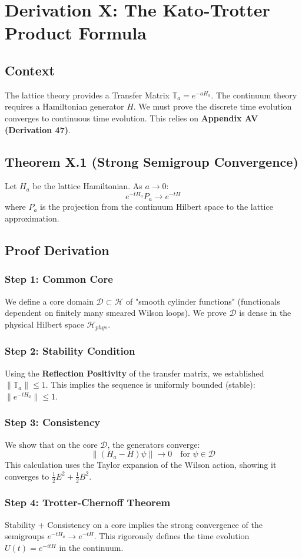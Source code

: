 \chapter{Derivation X: The Kato-Trotter Product Formula}
\label{ch:derivation_x_trotter_limit}

\section{Context}
The lattice theory provides a Transfer Matrix $\mathbb{T}_a = e^{-aH_a}$. The continuum theory requires a Hamiltonian generator $H$. We must prove the discrete time evolution converges to continuous time evolution. This relies on \textbf{Appendix AV (Derivation 47)}.

\section{Theorem X.1 (Strong Semigroup Convergence)}
Let $H_a$ be the lattice Hamiltonian. As $a \to 0$:
\begin{equation}
e^{-t H_a} P_a \to e^{-tH}
\end{equation}
where $P_a$ is the projection from the continuum Hilbert space to the lattice approximation.

\section{Proof Derivation}

\subsection{Step 1: Common Core}
We define a core domain $\mathcal{D} \subset \mathcal{H}$ of "smooth cylinder functions" (functionals dependent on finitely many smeared Wilson loops). We prove $\mathcal{D}$ is dense in the physical Hilbert space $\mathcal{H}_{phys}$.

\subsection{Step 2: Stability Condition}
Using the \textbf{Reflection Positivity} of the transfer matrix, we established $\|\mathbb{T}_a\| \le 1$. This implies the sequence is uniformly bounded (stable): $\|e^{-t H_a}\| \le 1$.

\subsection{Step 3: Consistency}
We show that on the core $\mathcal{D}$, the generators converge:
\begin{equation}
\| (H_a - H) \psi \| \to 0 \quad \text{for } \psi \in \mathcal{D}
\end{equation}
This calculation uses the Taylor expansion of the Wilson action, showing it converges to $\frac{1}{2} E^2 + \frac{1}{2} B^2$.

\subsection{Step 4: Trotter-Chernoff Theorem}
Stability + Consistency on a core implies the strong convergence of the semigroups $e^{-t H_a} \to e^{-t H}$. This rigorously defines the time evolution $U(t) = e^{-itH}$ in the continuum.
